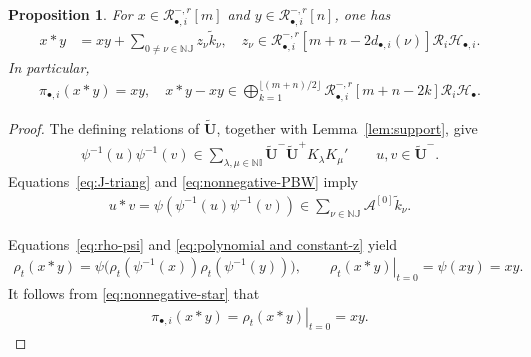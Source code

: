 \documentclass[a4paper,reqno,12pt]{amsart}
\numberwithin{equation}{section}
\newtheorem{proposition}{Proposition}[section]
\theoremstyle{definition}
\theoremstyle{plain}
\theoremstyle{definition}
\def\N{\mathbb N}
\def\I{\mathbb I}
\def\J{\mathbb J}
\def\tU{\widetilde{\mathbf U}}
\def\tk{\widetilde k}
\def\cA{\mathcal A}
\def\cR{\mathcal R}
\def\cH{\mathcal H}
\begin{document}
\begin{proposition}\label{prop:star}
For $x\in\cR_{\bullet,i}^{-,r}[m]$ and
$y\in\cR_{\bullet,i}^{-,r}[n]$, one has
\begin{align}
x*y&=xy+\sum_{0\neq\nu\in\N\J}
z_{\nu}\tk_\nu,\quad z_{\nu}\in\cR_{\bullet,i}^{-,r}[m+n-2d_{\bullet,i}(\nu)]\cR_i\cH_{\bullet,i}.
\label{eq:triangularity}
\end{align}
In particular,
\begin{align}
\pi_{\bullet,i}(x*y)=xy,\quad
x*y-xy\in\bigoplus_{k=1}^{\lfloor(m+n)/2\rfloor}
\cR_{\bullet,i}^{-,r}[m+n-2k]\cR_i\cH_\bullet.
\label{eq:star-projection}
\end{align}
\end{proposition}
\begin{proof}
The defining relations of $\tU$, together with Lemma~\ref{lem:support}, give
\begin{align}
\psi^{-1}(u)\psi^{-1}(v)
\in\sum_{\lambda,\mu\in\N\I}
\tU^-\tU^+K_\lambda K_\mu'
\qquad u,v\in\tU^-.
\label{eq:nonnegative-PBW}
\end{align}
Equations~\eqref{eq:J-triang} and \eqref{eq:nonnegative-PBW} imply
\begin{align}
u*v=\psi(\psi^{-1}(u)\psi^{-1}(v))\in\sum_{\nu\in\N\J}
\cA^{[0]}\tk_\nu.
\label{eq:nonnegative-star}
\end{align}

Equations~\eqref{eq:rho-psi} and \eqref{eq:polynomial and constant-z} yield
\begin{align}
\rho_t(x*y)
=\psi\bigl(\rho_t(\psi^{-1}(x))
\rho_t(\psi^{-1}(y))\bigr),\qquad
\left.\rho_t(x*y)\right|_{t=0}=\psi(xy)=xy.
\label{eq:rho-star}
\end{align}
It follows from \eqref{eq:nonnegative-star} that
\begin{align}
\pi_{\bullet,i}(x*y)=\left.\rho_t(x*y)\right|_{t=0}=xy.
\label{eq:constant-term}
\end{align}


\end{proof}
\end{document}
